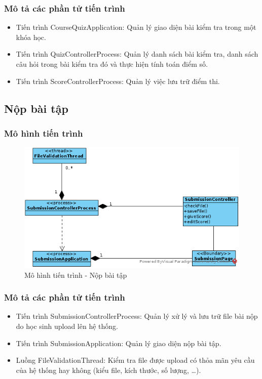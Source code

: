 \documentclass[./../main.tex]{subfiles}
\begin{document}
\subsubsection{Mô tả các phần tử tiến trình}
\begin{itemize}
	\item Tiến trình CourseQuizApplication: Quản lý giao diện bài kiểm tra trong một khóa học.
	\item Tiến trình QuizControllerProcess: Quản lý danh sách bài kiểm tra, danh sách câu hỏi trong bài kiểm tra đó và thực hiện tính toán điểm số.
	\item Tiến trình ScoreControllerProcess: Quản lý việc lưu trữ điểm thi.
	
\end{itemize}

\subsection{Nộp bài tập}

\subsubsection{Mô hình tiến trình}

\begin{figure}[H]
	\centering
	\includegraphics[width=\linewidth]{./images/pv_submit_assignment.png}
\caption{Mô hình tiến trình - Nộp bài tập}

\end{figure}

\subsubsection{Mô tả các phần tử tiến trình}

\begin{itemize}
	\item Tiến trình SubmissionControllerProcess: Quản lý xử lý và lưu trữ file bài nộp do học sinh upload lên hệ thống.
	\item Tiến trình SubmissionApplication: Quản lý giao diện nộp bài tập.
	\item Luồng FileValidationThread: Kiểm tra file được upload có thỏa mãn yêu cầu của hệ thống hay không (kiểu file, kích thước, số lượng, …).
\end{itemize}
\end{document}
